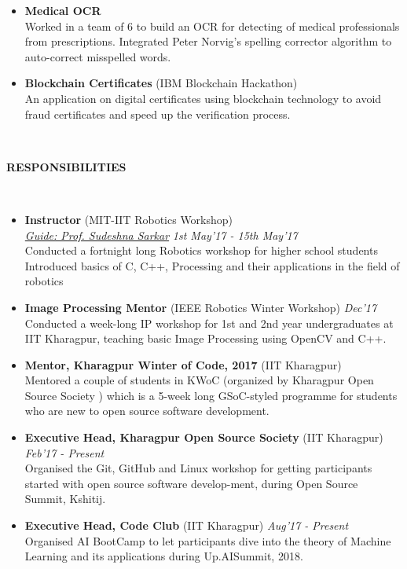 \documentclass[a4paper,8pt]{article}
\newcommand{\lsep}{-0.5cm}
\newcommand{\resheading}[1]{{\small \colorbox{mygrey}{\begin{minipage}{0.975\textwidth}{\textbf{#1 \vphantom{p\^{E}}}}\end{minipage}}}}
\begin{document}
\begin{itemize}
\item \textbf{Medical OCR} \hspace{0.5cm} \\
\small{Worked in a team of 6 to build an OCR for detecting of medical professionals from prescriptions. Integrated Peter Norvig's spelling corrector algorithm to auto-correct misspelled words.} 
	
\item \textbf{Blockchain Certificates} (IBM Blockchain Hackathon) \\
\small{An application on digital certificates using blockchain technology to avoid fraud certificates and speed up the verification process.} 
\end{itemize}


\hspace{0.5cm}\\[-0.2cm]
\resheading{\textbf{ RESPONSIBILITIES } }\\[\lsep]
\begin{itemize}
\item \textbf{Instructor} (MIT-IIT Robotics Workshop) \\
\href{https://cse.iitkgp.ac.in/~sudeshna/}{\textit{Guide: Prof. Sudeshna Sarkar}} \hfill \textit{1st May'17 - 15th May'17} \\
\small{Conducted a fortnight long Robotics workshop for higher school students
Introduced basics of C, C++, Processing and their applications in the field of robotics} 

\item \textbf{Image Processing Mentor} (IEEE Robotics Winter Workshop) \hfill \textit{Dec'17} \\
\small{Conducted a week-long IP workshop for 1st and 2nd year undergraduates at IIT Kharagpur, teaching basic Image Processing using OpenCV and C++.} 

\item \textbf{Mentor, Kharagpur Winter of Code, 2017} (IIT Kharagpur) \\
\small{Mentored a couple of students in KWoC (organized by Kharagpur Open Source Society
) which is a 5-week long GSoC-styled programme for students who are new to open source software development. } 

\item \textbf{Executive Head, Kharagpur Open Source Society} (IIT Kharagpur) \hfill \textit{Feb'17 - Present} \\
\small{Organised the Git, GitHub and Linux workshop for getting participants started with open source software develop-ment, during Open Source Summit, Kshitij.} 

\item \textbf{Executive Head, Code Club} (IIT Kharagpur) \hfill \textit{Aug'17 - Present} \\
\small{Organised AI BootCamp to let participants dive into the theory of Machine Learning and its applications during Up.AISummit, 2018.} 

\end{itemize}
\end{document}
